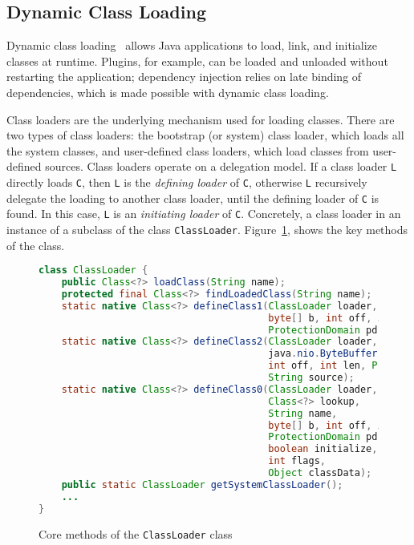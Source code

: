 \subsection{Dynamic Class Loading}\label{dynamic_class_loading}
Dynamic class loading~\cite{liang_dynamic_1998} allows Java applications to load, link, and initialize classes at runtime. Plugins, for example, can be loaded and unloaded without restarting the application; dependency injection relies on late binding of dependencies, which is made possible with dynamic class loading. 

Class loaders are the underlying mechanism used for loading classes. 
There are two types of class loaders: the bootstrap (or system) class loader, which loads all the system classes, and user-defined class loaders, which load classes from user-defined sources.
Class loaders operate on a delegation model. If a class loader \verb|L| directly loads \verb|C|, then \verb|L| is the \emph{defining loader} of \verb|C|, otherwise \verb|L| recursively delegate the loading to another class loader, until the defining loader of \verb|C| is found. In this case, \verb|L| is an \emph{initiating loader} of \verb|C|. Concretely, a class loader in an instance of a subclass of the class \verb|ClassLoader|. 
Figure~\ref{fig:classloader}, shows the key methods of the class.

\begin{figure}[ht]
    \centering
\begin{lstlisting}[language=Java]
class ClassLoader {
    public Class<?> loadClass(String name);
    protected final Class<?> findLoadedClass(String name);
    static native Class<?> defineClass1(ClassLoader loader, String name, 
                                        byte[] b, int off, int len,
                                        ProtectionDomain pd, String source);
    static native Class<?> defineClass2(ClassLoader loader, String name, 
                                        java.nio.ByteBuffer b,
                                        int off, int len, ProtectionDomain pd,
                                        String source);
    static native Class<?> defineClass0(ClassLoader loader,
                                        Class<?> lookup,
                                        String name,
                                        byte[] b, int off, int len,
                                        ProtectionDomain pd,
                                        boolean initialize,
                                        int flags,
                                        Object classData);
    public static ClassLoader getSystemClassLoader();
    ...
}
\end{lstlisting}
    \caption{Core methods of the \texttt{ClassLoader} class}
    \label{fig:classloader}
\end{figure}



